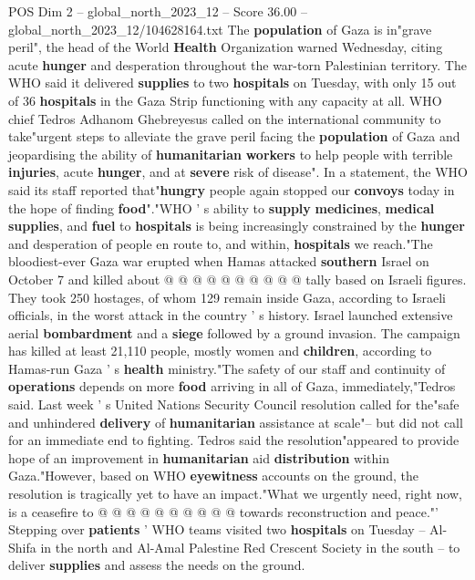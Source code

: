 \begin{textsample}{POS Dim 2 – global\_north\_2023\_12 – Score 36.00 – global\_north\_2023\_12/104628164.txt}  \label{ex:f2_pos_112}
The \textbf{population} of Gaza is in"grave peril", the head of the World \textbf{Health} Organization warned Wednesday, citing acute \textbf{hunger} and desperation throughout the war-torn Palestinian territory.
The WHO said it delivered \textbf{supplies} to two \textbf{hospitals} on Tuesday, with only 15 out of 36 \textbf{hospitals} in the Gaza Strip functioning with any capacity at all.
WHO chief Tedros Adhanom Ghebreyesus called on the international community to take"urgent steps to alleviate the grave peril facing the \textbf{population} of Gaza and jeopardising the ability of \textbf{humanitarian} \textbf{workers} to help people with terrible \textbf{injuries}, acute \textbf{hunger}, and at \textbf{severe} risk of disease".
In a statement, the WHO said its staff reported that"\textbf{hungry} people again stopped our \textbf{convoys} today in the hope of finding \textbf{food}"."WHO ' s ability to \textbf{supply} \textbf{medicines}, \textbf{medical} \textbf{supplies}, and \textbf{fuel} to \textbf{hospitals} is being increasingly constrained by the \textbf{hunger} and desperation of people en route to, and within, \textbf{hospitals} we reach."The bloodiest-ever Gaza war erupted when Hamas attacked \textbf{southern} Israel on October 7 and killed about @ @ @ @ @ @ @ @ @ @ tally based on Israeli figures.
They took 250 hostages, of whom 129 remain inside Gaza, according to Israeli officials, in the worst attack in the country ' s history.
Israel launched extensive aerial \textbf{bombardment} and a \textbf{siege} followed by a ground invasion.
The campaign has killed at least 21,110 people, mostly women and \textbf{children}, according to Hamas-run Gaza ' s \textbf{health} ministry."The safety of our staff and continuity of \textbf{operations} depends on more \textbf{food} arriving in all of Gaza, immediately,"Tedros said.
Last week ' s United Nations Security Council resolution called for the"safe and unhindered \textbf{delivery} of \textbf{humanitarian} assistance at scale"-- but did not call for an immediate end to fighting.
Tedros said the resolution"appeared to provide hope of an improvement in \textbf{humanitarian} aid \textbf{distribution} within Gaza."However, based on WHO \textbf{eyewitness} accounts on the ground, the resolution is tragically yet to have an impact."What we urgently need, right now, is a ceasefire to @ @ @ @ @ @ @ @ @ @ towards reconstruction and peace."' Stepping over \textbf{patients} ' WHO teams visited two \textbf{hospitals} on Tuesday -- Al-Shifa in the north and Al-Amal Palestine Red Crescent Society in the south -- to deliver \textbf{supplies} and assess the needs on the ground.

\end{textsample}

